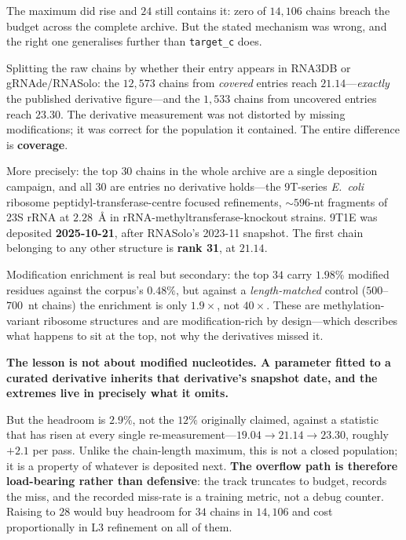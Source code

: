\documentclass[11pt,a4paper]{article}
\begin{document}
\noindent
The maximum did rise and $24$ still contains it: zero of $14{,}106$ chains
breach the budget across the complete archive. But the stated mechanism was
wrong, and the right one generalises further than \texttt{target\_c} does.

Splitting the raw chains by whether their entry appears in RNA3DB or
gRNAde/RNASolo: the $12{,}573$ chains from \emph{covered} entries reach
$\mathbf{21.14}$---\emph{exactly} the published derivative figure---and the
$1{,}533$ chains from uncovered entries reach $\mathbf{23.30}$. The derivative
measurement was not distorted by missing modifications; it was correct for the
population it contained. The entire difference is \textbf{coverage}.

More precisely: the top $30$ chains in the whole archive are a single deposition
campaign, and all $30$ are entries no derivative holds---the 9T-series
\emph{E.\ coli} ribosome peptidyl-transferase-centre focused refinements,
${\sim}596$-nt fragments of 23S rRNA at $2.28$~\AA{} in
rRNA-methyltransferase-knockout strains. 9T1E was deposited \textbf{2025-10-21},
after RNASolo's 2023-11 snapshot. The first chain belonging to any other
structure is \textbf{rank 31}, at $21.14$.

Modification enrichment is real but secondary: the top $34$ carry $1.98\%$
modified residues against the corpus's $0.48\%$, but against a
\emph{length-matched} control ($500$--$700$~nt chains) the enrichment is only
$\mathbf{1.9\times}$, not $40\times$. These are methylation-variant ribosome
structures and are modification-rich by design---which describes what happens to
sit at the top, not why the derivatives missed it.

\textbf{The lesson is not about modified nucleotides. A parameter fitted to a
curated derivative inherits that derivative's snapshot date, and the extremes
live in precisely what it omits.}

But the headroom is $\mathbf{2.9\%}$, not the $12\%$ originally claimed, against
a statistic that has risen at every single re-measurement---$19.04 \rightarrow
21.14 \rightarrow 23.30$, roughly $+2.1$ per pass. Unlike the chain-length
maximum, this is not a closed population; it is a property of whatever is
deposited next. \textbf{The overflow path is therefore load-bearing rather than
defensive}: the track truncates to budget, records the miss, and the recorded
miss-rate is a training metric, not a debug counter. Raising to $28$ would buy
headroom for $34$ chains in $14{,}106$ and cost proportionally in L3 refinement
on all of them.
\end{document}

